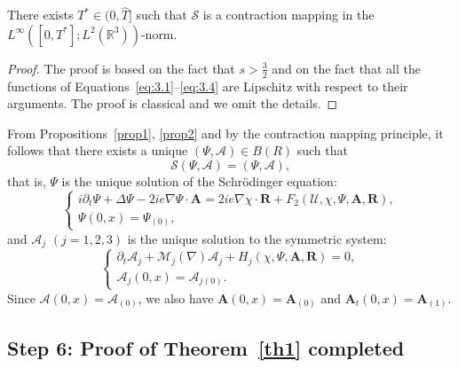 \documentclass[AHL,Unicode,longabstracts]{cedram}
\newcommand{\BA}{\mathbf{A}}
\newcommand{\BR}{\mathbf{R}}
\newcommand{\R}{\mathbb{R}}
\begin{document}
\begin{prop}\label{prop2}
There exists $T^* \in (0,\hat{T}]$ such that $\mathcal{S}$ is a contraction mapping in the $L^\infty ([0,T^*];L^2(\R^3))$-norm.
\end{prop}

\begin{proof}
The proof is based on the fact that $s>\frac{3}{2}$ and on the fact that all the functions of Equations~\eqref{eq:3.1}--\eqref{eq:3.4} are Lipschitz with respect to their arguments. The proof is classical and we omit the details.
\end{proof}

From Propositions~\ref{prop1}, \ref{prop2} and by the contraction mapping principle, it follows that there exists a unique $(\Psi, \mathcal{A}) \in B(R)$ such that
\[
\mathcal{S}(\Psi,\mathcal{A})=(\Psi,\mathcal{A}),
\]
that is, $\Psi$ is the unique solution of the Schr\"odinger equation:
\[
\begin{cases}
i\partial_t {\Psi}+\Delta {\Psi}- 2i e \nabla {\Psi} \cdot \BA = 2ie \nabla\chi \cdot \BR +F_2(\mathcal{U},\chi,\Psi,\BA, \BR), \\
\Psi(0,x)=\Psi_{(0)},
\end{cases}
\]
and $\mathcal{A}_j$ $(j=1,2,3)$ is the unique solution to the symmetric system:
\[
\begin{cases}
\partial_t \mathcal{A}_j+\mathcal{M}_j(\nabla)\mathcal{A}_j +H_j(\chi, \Psi, \BA, \BR)=0, \\
\mathcal{A}_j(0,x)=\mathcal{A}_{j(0)}.
\end{cases}
\]
Since $\mathcal{A}(0,x)=\mathcal{A}_{(0)}$, we also have $\BA(0,x)=\BA_{(0)}$ and $\BA_t(0,x)=\BA_{(1)}$.

\subsection*{Step 6: Proof of Theorem~\ref{th1} completed}
\end{document}

